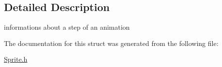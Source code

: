 \subsection{Detailed Description}
informations about a step of an animation 

The documentation for this struct was generated from the following file\+:\begin{DoxyCompactItemize}
\item 
\hyperlink{Sprite_8h}{Sprite.\+h}\end{DoxyCompactItemize}
